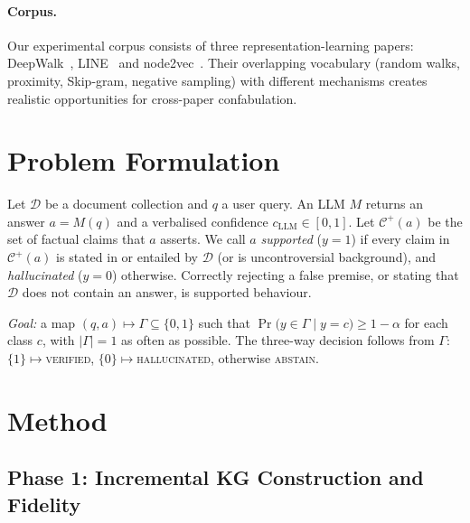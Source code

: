 \documentclass[10pt,twocolumn]{article}
\theoremstyle{remark}
\begin{document}
\paragraph{Corpus.}
Our experimental corpus consists of three representation-learning papers: DeepWalk~\cite{perozzi2014deepwalk},
LINE~\cite{tang2015line} and node2vec~\cite{grover2016node2vec}. Their overlapping vocabulary (random walks, proximity,
Skip-gram, negative sampling) with different mechanisms creates realistic opportunities for cross-paper
confabulation.

\section{Problem Formulation}
\label{sec:problem}

Let $\mathcal D$ be a document collection and $q$ a user query. An LLM $M$ returns an answer $a=M(q)$ and a verbalised
confidence $c_{\mathrm{LLM}}\in[0,1]$. Let $\mathcal C^{+}(a)$ be the set of factual claims that $a$ asserts. We call
$a$ \emph{supported} ($y=1$) if every claim in $\mathcal C^{+}(a)$ is stated in or entailed by $\mathcal D$ (or is
uncontroversial background), and \emph{hallucinated} ($y=0$) otherwise. Correctly rejecting a false premise, or
stating that $\mathcal D$ does not contain an answer, is supported behaviour.

\emph{Goal:} a map $(q,a)\mapsto\Gamma\subseteq\{0,1\}$ such that
$\Pr\big(y\in\Gamma\mid y=c\big)\ge 1-\alpha$ for each class $c$, with $|\Gamma|=1$ as often as possible. The
three-way decision follows from $\Gamma$: $\{1\}\mapsto$\textsc{verified}, $\{0\}\mapsto$\textsc{hallucinated},
otherwise \textsc{abstain}.

\section{Method}
\label{sec:method}

\subsection{Phase 1: Incremental KG Construction and Fidelity}
\label{sec:phase1}
\end{document}

